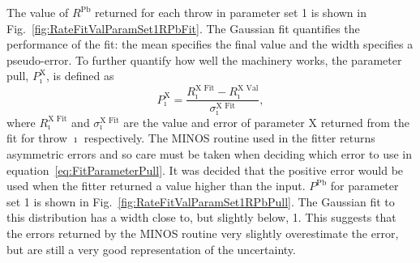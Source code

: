 \newline
\newline
The value of $R^{\textrm{Pb}}$ returned for each throw in parameter set 1 is shown in Fig.~\ref{fig:RateFitValParamSet1RPbFit}.  The Gaussian fit quantifies the performance of the fit: the mean specifies the final value and the width specifies a pseudo-error.  To further quantify how well the machinery works, the parameter pull, $P^{\textrm{X}}_{\imath}$, is defined as  
\begin{equation}
P^{\textrm{X}}_{\imath} = \frac{R^{\textrm{X Fit}}_{\imath} - R^{\textrm{X Val}}_{\imath}}{\sigma^{\textrm{X Fit}}_{\imath}},
\label{eq:FitParameterPull}
\end{equation}
where $R^{\textrm{X Fit}}_{\imath}$ and $\sigma^{\textrm{X Fit}}_{\imath}$ are the value and error of parameter $\textrm{X}$ returned from the fit for throw $\imath$ respectively.  The MINOS routine used in the fitter returns asymmetric errors and so care must be taken when deciding which error to use in equation~\ref{eq:FitParameterPull}.  It was decided that the positive error would be used when the fitter returned a value higher than the input.  $P^{\textrm{Pb}}$ for parameter set 1 is shown in Fig.~\ref{fig:RateFitValParamSet1RPbPull}.  The Gaussian fit to this distribution has a width close to, but slightly below, 1.  This suggests that the errors returned by the MINOS routine very slightly overestimate the error, but are still a very good representation of the uncertainty.
